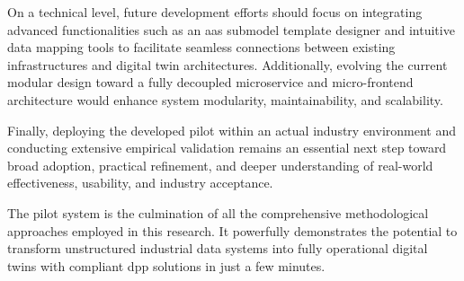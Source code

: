 On a technical level, future development efforts should focus on integrating advanced functionalities such as an \ac{aas} submodel template designer and intuitive data mapping tools to facilitate seamless connections between existing infrastructures and digital twin architectures. Additionally, evolving the current modular design toward a fully decoupled microservice and micro-frontend architecture would enhance system modularity, maintainability, and scalability.

Finally, deploying the developed pilot within an actual industry environment and conducting extensive empirical validation remains an essential next step toward broad adoption, practical refinement, and deeper understanding of real-world effectiveness, usability, and industry acceptance.

The pilot system is the culmination of all the comprehensive methodological approaches employed in this research. It powerfully demonstrates the potential to transform unstructured industrial data systems into fully operational digital twins with compliant \ac{dpp} solutions in just a few minutes.